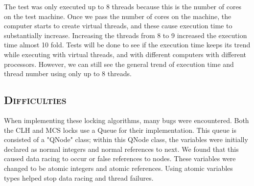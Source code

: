 \documentclass[CheckpointReport.tex]{subfiles}
\begin{document}
The test was only executed up to 8 threads because this is the number of cores on the test machine.  Once we pass the number of cores on the machine, the computer starts to create virtual threads, and these cause execution time to substantially increase.  Increasing the threads from 8 to 9 increased the execution time almost 10 fold.  Tests will be done to see if the execution time keeps its trend while executing with virtual threads, and with different computers with different processors.  However, we can still see the general trend of execution time and thread number using only up to 8 threads.  

\subsection*{\textsc{Difficulties}}
When implementing these locking algorithms, many bugs were encountered.  Both the CLH and MCS locks use a Queue for their implementation.  This queue is consisted of a "QNode" class; within this QNode class, the variables were initially declared as normal integers and normal references to next.  We found that this caused data racing to occur or false references to nodes.  These variables were changed to be atomic integers and atomic references.  Using atomic variables types helped stop data racing and thread failures.
\end{document}
